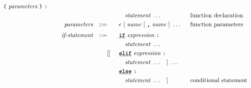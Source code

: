 \begin{alignat*}{9}
                                   \textbf{\texttt{(}}\  \textit{parameters} \ \textbf{\texttt{)}} \
                                   \textbf{\texttt{:}} \ \quad
                                                           && \\         
&&                       &&     &\quad && \quad \textit{statement} \ \ldots \quad
                                                           && \textrm{function declaration}\\                                                           
&& \textit{parameters}   && ::= &\quad &&  \epsilon\ | \  \textit{name} \ 
                                                   [\ \textbf{\texttt{,}} \ \textit{name}\ ]\ \ldots
                                                            && \textrm{function parameters}   \\[1mm]
&& \textit{if-statement} && ::= &\quad &&  \textbf{\texttt{\underline{if}}}\ \textit{expression} \ 
                                           \textbf{\texttt{:}}  \\
&&                       &&     &\quad && \quad \textit{statement} \ \ldots \quad
                                                           &&  \\  
&&                       &&     &      [[&& \textbf{\texttt{\underline{elif}}} \ \textit{expression} \
                                          \textbf{\texttt{:}} \\ 
&&                       &&     &\quad && \quad \textit{statement} \ \ldots \quad ] \ \ldots \quad 
                                                           &&  \\     
&&                       &&     &      && \textbf{\texttt{\underline{else}}}\
                                          \textbf{\texttt{:}} \\
&&                       &&     &\quad && \quad \textit{statement} \ \ldots \quad ]
                                                           && \textrm{conditional statement}  \\[1mm]

\end{alignat*}
